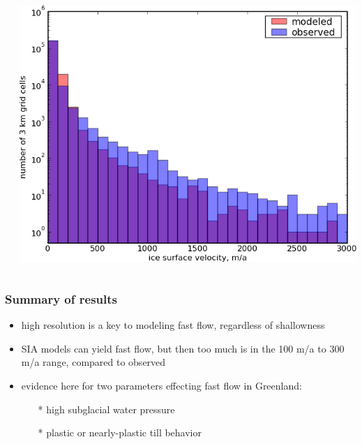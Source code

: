 \documentclass{beamer}
\begin{document}
\begin{frame}
\begin{columns}
\begin{column}{0.33\textwidth}
\begin{center}
\end{center}
\end{column}
\begin{column}{0.33\textwidth}
\begin{center}
  \includegraphics[width=1.0\textwidth]{g3km_3_10_98_hist}
\end{center}
\end{column}
\end{columns}
\end{frame}


\begin{frame}
  \frametitle{Summary of results}

\begin{itemize}
\item high resolution is a key to modeling fast flow, regardless of shallowness
\item SIA models can yield fast flow, but then too much is in the 100 m/a to 300 m/a range, compared to observed
\item evidence here for two parameters effecting fast flow in Greenland:
  \begin{itemize}
  \item[*] high subglacial water pressure
  \item[*] plastic or nearly-plastic till behavior
  \end{itemize}
\end{itemize}
\end{frame}
\end{document}
